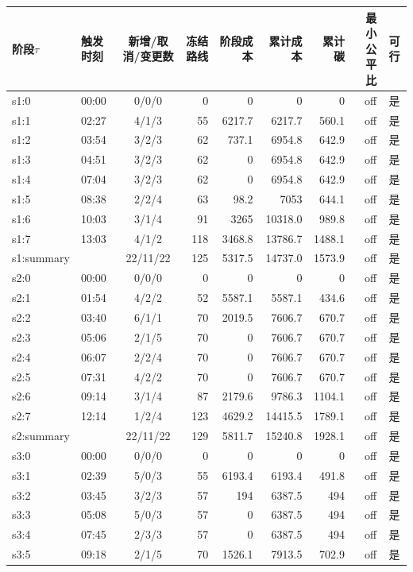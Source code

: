 \begin{tabular}{@{}llcrrrrrc@{}}
\toprule
阶段$\tau$ & 触发时刻 & 新增/取消/变更数 & 冻结路线 & 阶段成本 & 累计成本 & 累计碳 & 最小公平比 & 可行\\
\midrule
s1:0 & 00:00 & 0/0/0 & 0 & 0 & 0 & 0 & off & 是\\
s1:1 & 02:27 & 4/1/3 & 55 & 6217.7 & 6217.7 & 560.1 & off & 是\\
s1:2 & 03:54 & 3/2/3 & 62 & 737.1 & 6954.8 & 642.9 & off & 是\\
s1:3 & 04:51 & 3/2/3 & 62 & 0 & 6954.8 & 642.9 & off & 是\\
s1:4 & 07:04 & 3/2/3 & 62 & 0 & 6954.8 & 642.9 & off & 是\\
s1:5 & 08:38 & 2/2/4 & 63 & 98.2 & 7053 & 644.1 & off & 是\\
s1:6 & 10:03 & 3/1/4 & 91 & 3265 & 10318.0 & 989.8 & off & 是\\
s1:7 & 13:03 & 4/1/2 & 118 & 3468.8 & 13786.7 & 1488.1 & off & 是\\
s1:summary &  & 22/11/22 & 125 & 5317.5 & 14737.0 & 1573.9 & off & 是\\
s2:0 & 00:00 & 0/0/0 & 0 & 0 & 0 & 0 & off & 是\\
s2:1 & 01:54 & 4/2/2 & 52 & 5587.1 & 5587.1 & 434.6 & off & 是\\
s2:2 & 03:40 & 6/1/1 & 70 & 2019.5 & 7606.7 & 670.7 & off & 是\\
s2:3 & 05:06 & 2/1/5 & 70 & 0 & 7606.7 & 670.7 & off & 是\\
s2:4 & 06:07 & 2/2/4 & 70 & 0 & 7606.7 & 670.7 & off & 是\\
s2:5 & 07:31 & 4/2/2 & 70 & 0 & 7606.7 & 670.7 & off & 是\\
s2:6 & 09:14 & 3/1/4 & 87 & 2179.6 & 9786.3 & 1104.1 & off & 是\\
s2:7 & 12:14 & 1/2/4 & 123 & 4629.2 & 14415.5 & 1789.1 & off & 是\\
s2:summary &  & 22/11/22 & 129 & 5811.7 & 15240.8 & 1928.1 & off & 是\\
s3:0 & 00:00 & 0/0/0 & 0 & 0 & 0 & 0 & off & 是\\
s3:1 & 02:39 & 5/0/3 & 55 & 6193.4 & 6193.4 & 491.8 & off & 是\\
s3:2 & 03:45 & 3/2/3 & 57 & 194 & 6387.5 & 494 & off & 是\\
s3:3 & 05:08 & 5/0/3 & 57 & 0 & 6387.5 & 494 & off & 是\\
s3:4 & 07:45 & 2/3/3 & 57 & 0 & 6387.5 & 494 & off & 是\\
s3:5 & 09:18 & 2/1/5 & 70 & 1526.1 & 7913.5 & 702.9 & off & 是\\

\end{tabular}
